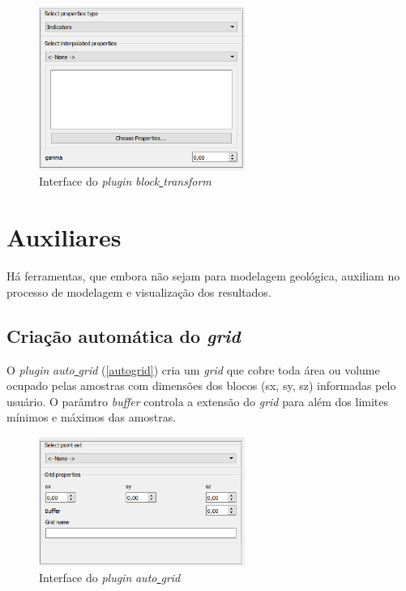 \begin{figure}[H]
	\caption{\label{bltrans}Interface do \textit{plugin} \textit{block\underline{ }transform}}
	\centering
		\includegraphics[width=0.6\textwidth]{apendice/imagens/block_tr.PNG}
\end{figure}

\section{Auxiliares}

Há ferramentas, que embora não sejam para modelagem geológica, auxiliam no processo de modelagem e visualização dos resultados.

\subsection{Criação automática do \textit{grid}}

O \textit{plugin} \textit{auto\underline{ }grid} (\autoref{autogrid}) cria um \textit{grid} que cobre toda área ou volume ocupado pelas amostras com dimensões dos blocos (sx, sy, sz) informadas pelo usuário. O parâmtro \textit{buffer} controla a extensão do \textit{grid} para além dos limites mínimos e máximos das amostras.

\begin{figure}[H]
	\caption{\label{autogrid}Interface do \textit{plugin} \textit{auto\underline{ }grid}}
	\centering
		\includegraphics[width=0.6\textwidth]{apendice/imagens/autogrid.PNG}
\end{figure}

